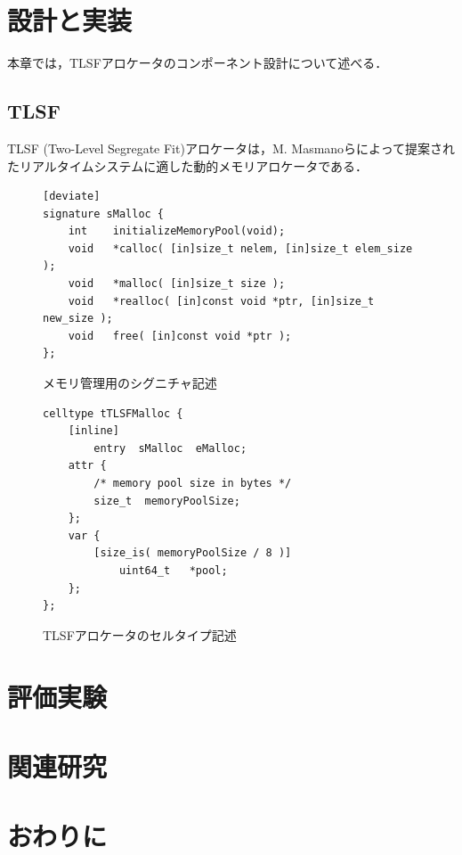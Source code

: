 \documentclass[submit]{ipsj_v2/UTF8/ipsj}
\begin{document}
\section{設計と実装}
\label{sec:Design and Implementation}

本章では，TLSFアロケータのコンポーネント設計について述べる．


\subsection{TLSF}
\label{sec:TLSF}
TLSF (Two-Level Segregate Fit)アロケータは，M. Masmanoらによって提案されたリアルタイムシステムに適した動的メモリアロケータである．

\begin{figure}[t]
\centering
\begin{lstlisting}
[deviate]
signature sMalloc {
    int    initializeMemoryPool(void);
    void   *calloc( [in]size_t nelem, [in]size_t elem_size );
    void   *malloc( [in]size_t size );
    void   *realloc( [in]const void *ptr, [in]size_t new_size );
    void   free( [in]const void *ptr );
};
\end{lstlisting}
\caption{メモリ管理用のシグニチャ記述}  
\label{src:TLSFSignature}
\end{figure}

\begin{figure}[t]
\centering
\begin{lstlisting}
celltype tTLSFMalloc {
    [inline]
        entry  sMalloc  eMalloc;
    attr {
        /* memory pool size in bytes */
        size_t  memoryPoolSize;
    };
    var {
        [size_is( memoryPoolSize / 8 )]
            uint64_t   *pool;
    };
};
\end{lstlisting}
\caption{TLSFアロケータのセルタイプ記述}  
\label{src:TLSFCelltype}
\end{figure}

\section{評価実験}
\label{sec:Evaluation}

\section{関連研究}
\label{sec:Related Work}

\section{おわりに}
\label{sec:Conclusion}
\end{document}

